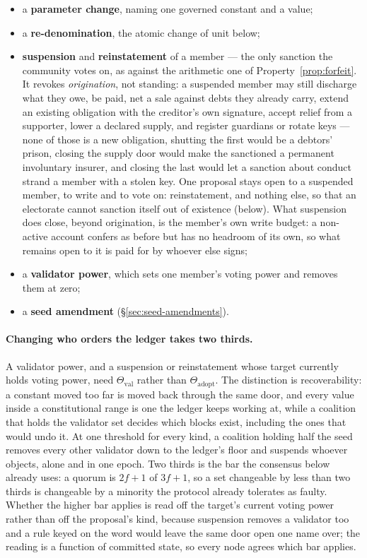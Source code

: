 \begin{itemize}[leftmargin=1.4em]
  \item a \textbf{parameter change}, naming one governed constant and a value;
  \item a \textbf{re-denomination}, the atomic change of unit below;
  \item \textbf{suspension} and \textbf{reinstatement} of a member --- the only sanction
        the community votes on, as against the arithmetic one of
        Property~\ref{prop:forfeit}. It revokes \emph{origination}, not standing: a
        suspended member may still discharge what they owe, be paid, net a sale against
        debts they already carry, extend an existing obligation with the creditor's own
        signature, accept relief from a supporter, lower a declared supply, and register
        guardians or rotate keys --- none of those is a new obligation, shutting the first
        would be a debtors' prison, closing the supply door would make the sanctioned a
        permanent involuntary insurer, and closing the last would let a sanction about
        conduct strand a member with a stolen key. One proposal stays open to a suspended
        member, to write and to vote on: reinstatement, and nothing else, so that an
        electorate cannot sanction itself out of existence (below). What suspension does
        close, beyond origination, is the member's own write budget: a non-active account
        confers as before but has no headroom of its own, so what remains open to it is
        paid for by whoever else signs;
  \item a \textbf{validator power}, which sets one member's voting power and removes them
        at zero;
  \item a \textbf{seed amendment} (\S\ref{sec:seed-amendments}).
\end{itemize}

\paragraph{Changing who orders the ledger takes two thirds.} A validator power, and a
suspension or reinstatement whose target currently holds voting power, need
$\Theta_{\mathrm{val}}$ rather than $\Theta_{\mathrm{adopt}}$. The distinction is
recoverability: a constant moved too far is moved back through the same door, and every
value inside a constitutional range is one the ledger keeps working at, while a coalition
that holds the validator set decides which blocks exist, including the ones that would
undo it. At one threshold for every kind, a coalition holding half the seed removes every
other validator down to the ledger's floor and suspends whoever objects, alone and in one
epoch. Two thirds is the bar the consensus below already uses: a quorum is $2f+1$ of
$3f+1$, so a set changeable by less than two thirds is changeable by a minority the
protocol already tolerates as faulty. Whether the higher bar applies is read off the
target's current voting power rather than off the proposal's kind, because suspension
removes a validator too and a rule keyed on the word would leave the same door open one
name over; the reading is a function of committed state, so every node agrees which bar
applies.

